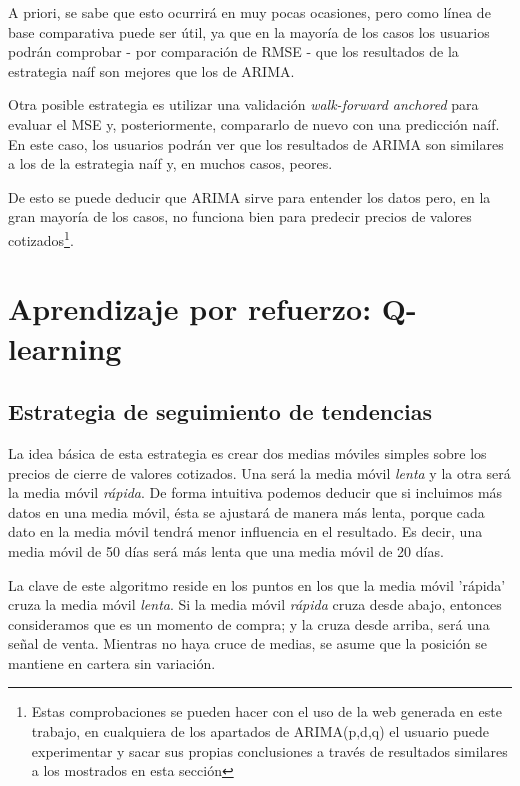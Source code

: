 A priori, se sabe que esto ocurrirá en muy pocas ocasiones, pero como línea de base comparativa puede ser útil, ya que en la mayoría de los casos los usuarios podrán comprobar - por comparación de RMSE - que los resultados de la estrategia naíf son mejores que los de ARIMA. 


Otra posible estrategia es utilizar una validación \emph{walk-forward anchored}\citep{online:walk_forward} para evaluar el MSE y, posteriormente, compararlo de nuevo con una predicción naíf. En este caso, los usuarios podrán ver que los resultados de ARIMA son similares a los de la estrategia naíf y, en muchos casos, peores. 


De esto se puede deducir que ARIMA sirve para entender los datos pero, en la gran mayoría de los casos, no funciona bien para predecir precios de valores cotizados\footnote{Estas comprobaciones se pueden hacer con el uso de la web generada en este trabajo, en cualquiera de los apartados de ARIMA(p,d,q) el usuario puede experimentar y sacar sus propias conclusiones a través de resultados similares a los mostrados en esta sección}. 


\section{Aprendizaje por refuerzo: Q-learning}\label{q_learning}

\subsection{Estrategia de seguimiento de tendencias}

La idea básica de esta estrategia es crear dos medias móviles simples sobre los precios de cierre de valores cotizados. Una será la media móvil \emph{lenta} y la otra será la media móvil \emph{rápida}. De forma intuitiva podemos deducir que si incluimos más datos en una media móvil, ésta se ajustará de manera más lenta, porque cada dato en la media móvil tendrá menor influencia en el resultado. Es decir, una media móvil de 50 días será más lenta que una media móvil de 20 días. 

La clave de este algoritmo reside en los puntos en los que la media móvil 'rápida' cruza la media móvil \emph{lenta}. Si la media móvil \emph{rápida} cruza desde abajo, entonces consideramos que es un momento de compra; y la cruza desde arriba, será una señal de venta. Mientras no haya cruce de medias, se asume que la posición se mantiene en cartera sin variación. 

